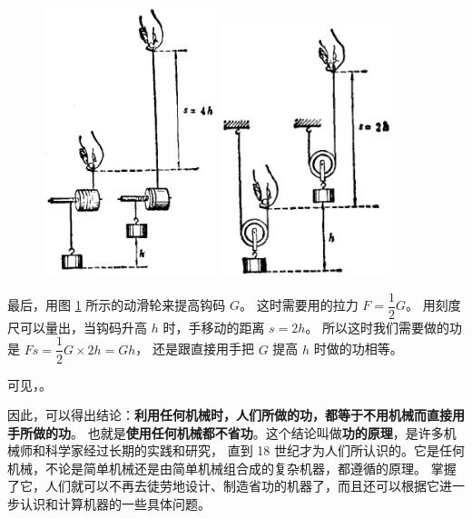 \begin{figure}[htbp]
    \centering
    \begin{minipage}{7cm}
    \centering
    \includegraphics[width=5cm]{../pic/czwl1-ch8-3}
    \caption{}\label{fig:8-3}
    \end{minipage}
    \qquad
    \begin{minipage}{7cm}
    \centering
    \includegraphics[width=5cm]{../pic/czwl1-ch8-4}
    \caption{}\label{fig:8-4}
    \end{minipage}
\end{figure}

最后，用图 \ref{fig:8-4} 所示的动滑轮来提高钩码 $G$。
这时需要用的拉力 $F = \dfrac{1}{2} G$。
用刻度尺可以量出，当钩码升高 $h$ 时，手移动的距离 $s = 2h$。
所以这时我们需要做的功是 $Fs = \dfrac{1}{2} G \times 2h = Gh$，
还是跟直接用手把 $G$ 提高 $h$ 时做的功相等。

可见，。

因此，可以得出结论：\textbf{利用任何机械时，人们所做的功，都等于不用机械而直接用手所做的功}。
也就是\textbf{使用任何机械都不省功}。这个结论叫做\textbf{功的原理}，是许多机械师和科学家经过长期的实践和研究，
直到 18 世纪才为人们所认识的。它是任何机械，不论是简单机械还是由简单机械组合成的复杂机器，都遵循的原理。
掌握了它，人们就可以不再去徒劳地设计、制造省功的机器了，而且还可以根据它进一步认识和计算机器的一些具体问题。

